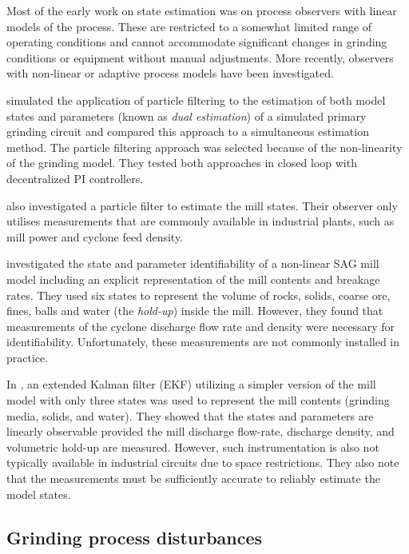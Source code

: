 Most of the early work on state estimation was on process observers with linear models of the process. These are restricted to a somewhat limited range of operating conditions and cannot accommodate significant changes in grinding conditions or equipment without manual adjustments. More recently, observers with non-linear or adaptive process models have been investigated.

\cite{olivier_dual_2012} simulated the application of particle filtering to the estimation of both model states and parameters (known as \textit{dual estimation}) of a simulated primary grinding circuit and compared this approach to a simultaneous estimation method. The particle filtering approach was selected because of the non-linearity of the grinding model. They tested both approaches in closed loop with decentralized PI controllers.

\cite{le_roux_throughput_2016} also investigated a particle filter to estimate the mill states. Their observer only utilises measurements that are commonly available in industrial plants, such as mill power and cyclone feed density.

\cite{le_roux_state_2016} investigated the state and parameter identifiability of a non-linear \gls{SAG} mill model including an explicit representation of the mill contents and breakage rates. They used six states to represent the volume of rocks, solids, coarse ore, fines, balls and water (the \textit{hold-up}) inside the mill. However, they found that measurements of the cyclone discharge flow rate and density were necessary for identifiability. Unfortunately, these measurements are not commonly installed in practice.

In \cite{le_roux_ekf_2017}, an extended Kalman filter (EKF) utilizing a simpler version of the mill model with only three states was used to represent the mill contents (grinding media, solids, and water). They showed that the states and parameters are linearly observable provided the mill discharge flow-rate, discharge density, and volumetric hold-up are measured. However, such instrumentation is also not typically available in industrial circuits due to space restrictions. They also note that the measurements must be sufficiently accurate to reliably estimate the model states.

\subsection{Grinding process disturbances}

